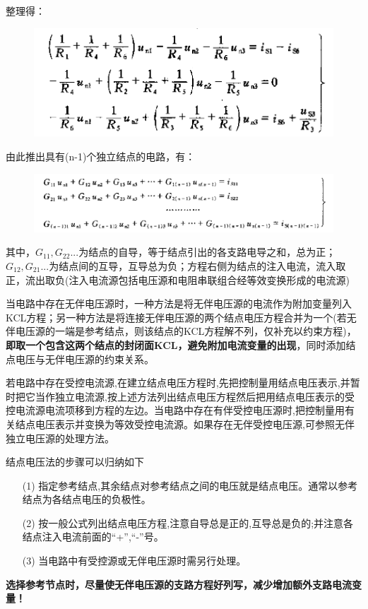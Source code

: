\documentclass[11pt,a4paper,oneside]{book}
\begin{document}
整理得：
\begin{figure}[H]
	\centering
	\includegraphics[width=0.6\linewidth]{screenshot045}
	\caption{}
	\label{fig:screenshot045}
\end{figure}
由此推出具有(n-1)个独立结点的电路，有：
\begin{figure}[H]
	\centering
	\includegraphics[width=0.8\linewidth]{screenshot046}
	\caption{}
	\label{fig:screenshot046}
\end{figure}
其中，$G_{11},G_{22}...$为结点的自导，等于结点引出的各支路电导之和，总为正；$G_{12},G_{21}...$为结点间的互导，互导总为负；方程右侧为结点的注入电流，流入取正，流出取负(注入电流源包括电压源和电阻串联组合经等效变换形成的电流源)

当电路中存在无伴电压源时，一种方法是将无伴电压源的电流作为附加变量列入KCL方程；另一种方法是将连接无伴电压源的两个结点电压方程合并为一个(若无伴电压源的一端是参考结点，则该结点的KCL方程解不列，仅补充以约束方程)，\textbf{即取一个包含这两个结点的封闭面KCL，避免附加电流变量的出现}，同时添加结点电压与无伴电压源的约束关系。

若电路中存在受控电流源,在建立结点电压方程时,先把控制量用结点电压表示,并暂时把它当作独立电流源,按上述方法列出结点电压方程然后把用结点电压表示的受控电流源电流项移到方程的左边。当电路中存在有伴受控电压源时,把控制量用有关结点电压表示并变换为等效受控电流源。如果存在无伴受控电压源,可参照无伴独立电压源的处理方法。

结点电压法的步骤可以归纳如下
\begin{enumerate}\setlength{\itemsep}{0.2pt}
	\item[(1)] 指定参考结点,其余结点对参考结点之间的电压就是结点电压。通常以参考结点为各结点电压的负极性。
	\item[(2)] 按一般公式列出结点电压方程,注意自导总是正的,互导总是负的;并注意各结点注入电流前面的“+”,“-”号。
	\item[(3)] 当电路中有受控源或无伴电压源时需另行处理。
\end{enumerate}
\textbf{选择参考节点时，尽量使无伴电压源的支路方程好列写，减少增加额外支路电流变量！}
\end{document}
